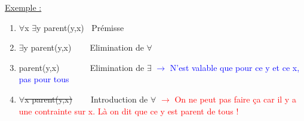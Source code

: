\begin{flushleft}
\underline{Exemple :}\\
\begin{enumerate}
\item $\forall$x $\exists$y parent(y,x) $\>$ Prémisse
\item $\exists$y parent(y,x) $\>$ $\>$ $\>$ $\>$Elimination de $\forall$
\item parent(y,x) $\>$ $\>$ $\>$ $\>$ $\>$ $\>$ Elimination de $\exists$ \textcolor{blue}{$\rightarrow$ N'est valable que pour ce y et ce x, pas pour tous}
\item \sout{$\forall$x parent(y,x)} $\>$ $\>$ $\>$ $\>$Introduction de $\forall$ \textcolor{red}{$\rightarrow$ On ne peut pas faire ça car il y a une contrainte sur x. Là on dit que ce y est parent de tous !}
\end{enumerate}




\end{flushleft}
